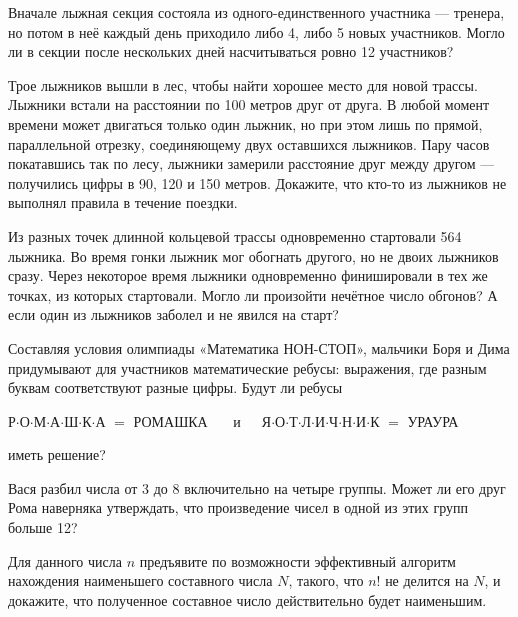 \begin{itemize}
\itA Вначале лыжная секция состояла из одного-единственного участника — тренера, но потом в неё каждый день приходило либо 4, либо 5 новых участников. Могло ли в секции после нескольких дней насчитываться ровно 12 участников?

\itB Трое лыжников вышли в лес, чтобы найти хорошее место для новой трассы. Лыжники встали на расстоянии по 100 метров друг от друга. В любой момент времени может двигаться только один лыжник, но при этом лишь по прямой, параллельной отрезку, соединяющему двух оставшихся лыжников. Пару часов покатавшись так по лесу, лыжники замерили расстояние друг между другом — получились цифры в 90, 120 и 150 метров. Докажите, что кто-то из лыжников не выполнял правила в течение поездки.

\itC Из разных точек длинной кольцевой трассы одновременно стартовали 564 лыжника. Во время гонки лыжник мог обогнать другого, но не двоих лыжников сразу. Через некоторое время лыжники одновременно финишировали в тех же точках, из которых стартовали. Могло ли произойти нечётное число обгонов? А если один из лыжников заболел и не явился на старт?
\end{itemize}

\begin{itemize}
\itA Составляя условия олимпиады «Математика НОН-СТОП», мальчики Боря и Дима придумывают для участников математические ребусы: выражения, где разным буквам соответствуют разные цифры. Будут ли ребусы \smallskip \\
\centerline{Р$\cdot$О$\cdot$М$\cdot$А$\cdot$Ш$\cdot$К$\cdot$А $=$ РОМАШКА
\ \ \ и\ \ \ 
Я$\cdot$О$\cdot$Т$\cdot$Л$\cdot$И$\cdot$Ч$\cdot$Н$\cdot$И$\cdot$К $=$ УРАУРА} \smallskip
иметь решение?

\itB Вася разбил числа от 3 до 8 включительно на четыре группы. Может ли его друг Рома наверняка утверждать, что произведение чисел в одной из этих групп больше 12?

\itC Для данного числа $n$ предъявите по возможности эффективный алгоритм нахождения 
наименьшего составного числа $N$, такого, 
что $n!$ не делится на $N$, и докажите, что полученное составное число действительно будет 
наименьшим.
\end{itemize}

